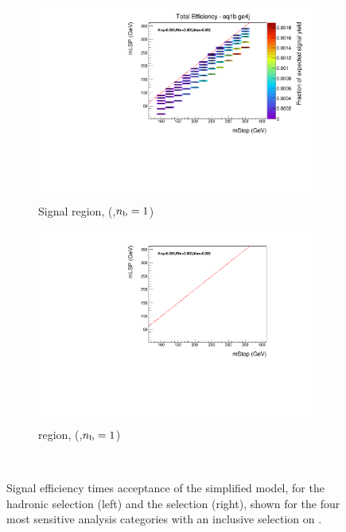 \begin{figure}[p]
\begin{subfigure}[b]{0.47\textwidth}
    \includegraphics[width=\textwidth]{Figs/sms/t2cc/v37/effs/T2cc_had_eff_maps_eq1b_ge4j_SITV.pdf}
    \caption{Signal region, (\njhigh,$n_{\text{b}}=1$)}
    \label{fig:t2cc_sig_eff_ge4j_1b}
  \end{subfigure}
  \begin{subfigure}[b]{0.47\textwidth}
    \includegraphics[width=\textwidth]{Figs/sms/t2cc/v37/effs/T2cc_muon_eff_maps_eq1b_ge4j_SITV.pdf}
    \caption{\mj region, (\njhigh,$n_{\text{b}}=1$)}
    \label{fig:t2cc_mu_eff_ge4j_1b}
  \end{subfigure} \\
  \caption{Signal efficiency times acceptance of the \Ttwocc simplified model,
  for
  the hadronic selection (left) and the \mj selection (right), shown for the 
  four most sensitive analysis categories with an inclusive selection on \HT.}
  \label{fig:t2cc_eff}
\end{figure}

